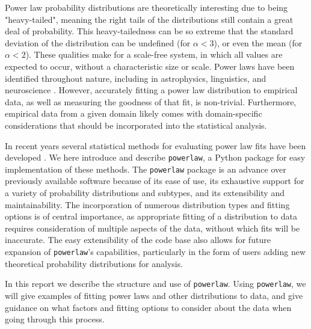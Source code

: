 \documentclass[10pt]{article}
\begin{document}
 Power law probability distributions are theoretically interesting due to being  "heavy-tailed", meaning the right tails of the distributions still contain a great deal of probability. This heavy-tailedness can be so extreme that the standard deviation of the distribution can be undefined (for $\alpha<3$), or even the mean (for $\alpha<2$). These qualities make for a scale-free system, in which all values are expected to occur, without a characteristic size or scale. Power laws have been identified throughout nature, including in astrophysics, linguistics, and neuroscience \cite{Michel2011, Zipf1935, Beggs2003, Shriki2013}. However, accurately fitting a power law distribution to empirical data, as well as measuring the goodness of that fit, is non-trivial. Furthermore, empirical data from a given domain likely comes with domain-specific considerations that should be incorporated into the statistical analysis.
 
In recent years several statistical methods for evaluating power law fits have been developed \cite{Clauset2009, Klaus2011}. We here introduce and describe \verb$powerlaw$, a Python package for easy implementation of these methods. The \verb$powerlaw$ package is an advance over previously available software because of its ease of use, its exhaustive support for a variety of probability distributions and subtypes, and its extensibility and maintainability. The incorporation of numerous distribution types and fitting options is of central importance, as appropriate fitting of a distribution to data requires consideration of multiple aspects of the data, without which fits will be inaccurate. The easy extensibility of the code base also allows for future expansion of \verb$powerlaw$'s capabilities, particularly in the form of users adding new theoretical probability distributions for analysis.
 
In this report we describe the structure and use of \verb$powerlaw$. Using \verb$powerlaw$, we will give examples of fitting power laws and other distributions to data, and give guidance on what factors and fitting options to consider about the data when going through this process.
 
\end{document}

